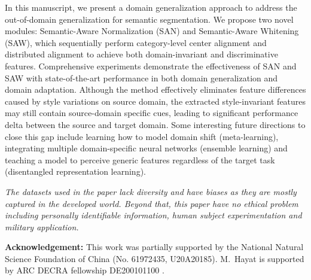 \documentclass[10pt,twocolumn,letterpaper]{article}
\begin{document}
In this manuscript, we present a domain generalization approach to address the out-of-domain generalization for semantic segmentation. We propose two novel modules: Semantic-Aware Normalization (SAN) and Semantic-Aware Whitening (SAW), which sequentially perform category-level center alignment and distributed alignment to achieve both domain-invariant and discriminative features. Comprehensive experiments demonstrate the effectiveness of SAN and SAW with state-of-the-art performance in both domain generalization and domain adaptation. Although the method effectively eliminates feature differences caused by style variations on source domain, the extracted style-invariant features may still contain source-domain specific cues, leading to significant performance delta between the source and target domain. Some interesting future directions to close this gap include learning how to model domain shift (meta-learning), integrating multiple domain-specific neural networks (ensemble learning) and teaching a model to perceive generic features regardless of the target task (disentangled representation learning).




\textit{The datasets used in the paper lack diversity and have biases as they are mostly captured in the developed world. Beyond that, this paper have no ethical problem including personally identifiable information, human subject experimentation and military application.} 

\noindent \textbf{Acknowledgement:} This work was partially supported by the National Natural Science Foundation of China (No. 61972435, U20A20185). M.~Hayat is supported by ARC DECRA fellowship DE200101100 .



\balance
{\small


}
\end{document}
